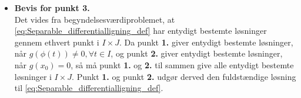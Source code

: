 \begin{bev}
\begin{itemize}
        \item[] \textbf{Bevis for punkt 3.}\\ 
            Det vides fra begyndelsesværdiproblemet, at \eqref{eq:Separable_differentialligning_def} har entydigt bestemte løsninger gennem ethvert punkt i $I\times J$. Da punkt \textbf{1.} giver entydigt bestemte løsninger, når $g(\phi(t)) \neq 0, \forall t\in I$, og punkt \textbf{2.} giver entydigt bestemte løsninger, når $g(x_0)=0$, så må punkt \textbf{1.} og \textbf{2.} til sammen give alle entydigt bestemte løsninger i $I \times J$. Punkt \textbf{1.} og punkt \textbf{2.} udgør derved den fuldstændige løsning til \eqref{eq:Separable_differentialligning_def}.
    \end{itemize}
\end{bev}

